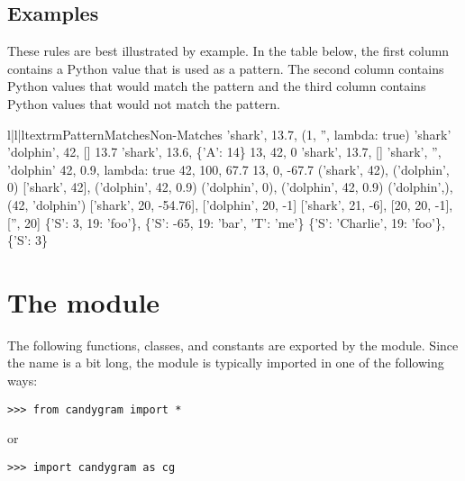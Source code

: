 \documentclass{howto}
\newcommand{\lessthan}[0]{\begin{math}<\end{math}}
\newcommand{\greaterthan}[0]{\begin{math}>\end{math}}
\newcommand{\lessthan}[0]{<}
\newcommand{\greaterthan}[0]{>}
\begin{document}
\subsection{Examples}
These rules are best illustrated by example. In the table below, the first
column contains a Python value that is used as a pattern. The second column
contains Python values that would match the pattern and the third column
contains Python values that would not match the pattern.
\begin{tableiii}{l|l|l}{textrm}{Pattern}{Matches}{Non-Matches}
	{'shark', 13.7, (1, '', lambda: true)}
	{}
	{'shark'}
	{'dolphin', 42, []}
	{13.7}
	{'shark', 13.6, \{'A': 14\}}
	{13, 42, 0}
	{'shark', 13.7, []}
	{'shark', '', 'dolphin'}
	{42, 0.9, lambda: true}
\lineiii{lambda x: x \greaterthan\ 20}
	{42, 100, 67.7}
	{13, 0, -67.7}
	{('shark', 42), ('dolphin', 0)}
	{['shark', 42], ('dolphin', 42, 0.9)}
	{('dolphin', 0), ('dolphin', 42, 0.9)}
	{('dolphin',), (42, 'dolphin')}
\lineiii{[str, 20, lambda x: x \lessthan\ 0]}
	{['shark', 20, -54.76], ['dolphin', 20, -1]}
	{['shark', 21, -6], [20, 20, -1], ['', 20]}
	{\{'S': 3, 19: 'foo'\}, \{'S': -65, 19: 'bar', 'T': 'me'\}}
	{\{'S': 'Charlie', 19: 'foo'\}, \{'S': 3\}}
\end{tableiii}



\section{The  module}


The following functions, classes, and constants are exported by the
 module. Since the name  is a bit long, the
module is typically imported in one of the following ways:
\begin{verbatim}
>>> from candygram import *
\end{verbatim}
or
\begin{verbatim}
>>> import candygram as cg
\end{verbatim}



\end{document}
